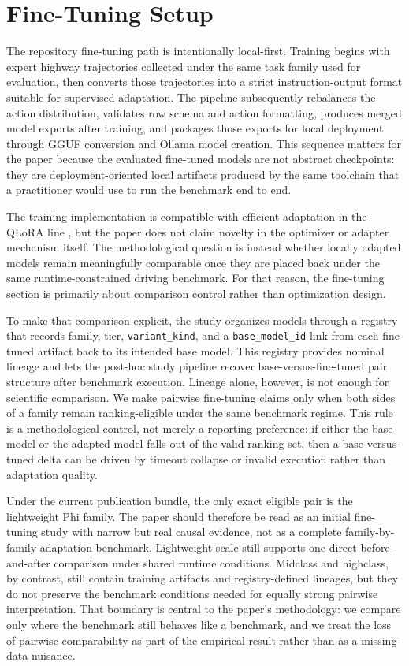\section{Fine-Tuning Setup}

The repository fine-tuning path is intentionally local-first. Training begins with expert highway trajectories collected under the same task family used for evaluation, then converts those trajectories into a strict instruction-output format suitable for supervised adaptation. The pipeline subsequently rebalances the action distribution, validates row schema and action formatting, produces merged model exports after training, and packages those exports for local deployment through GGUF conversion and Ollama model creation. This sequence matters for the paper because the evaluated fine-tuned models are not abstract checkpoints: they are deployment-oriented local artifacts produced by the same toolchain that a practitioner would use to run the benchmark end to end.

The training implementation is compatible with efficient adaptation in the QLoRA line \cite{dettmers2023qlora}, but the paper does not claim novelty in the optimizer or adapter mechanism itself. The methodological question is instead whether locally adapted models remain meaningfully comparable once they are placed back under the same runtime-constrained driving benchmark. For that reason, the fine-tuning section is primarily about comparison control rather than optimization design.

To make that comparison explicit, the study organizes models through a registry that records family, tier, \texttt{variant\_kind}, and a \texttt{base\_model\_id} link from each fine-tuned artifact back to its intended base model. This registry provides nominal lineage and lets the post-hoc study pipeline recover base-versus-fine-tuned pair structure after benchmark execution. Lineage alone, however, is not enough for scientific comparison. We make pairwise fine-tuning claims only when both sides of a family remain ranking-eligible under the same benchmark regime. This rule is a methodological control, not merely a reporting preference: if either the base model or the adapted model falls out of the valid ranking set, then a base-versus-tuned delta can be driven by timeout collapse or invalid execution rather than adaptation quality.

Under the current publication bundle, the only exact eligible pair is the lightweight Phi family. The paper should therefore be read as an initial fine-tuning study with narrow but real causal evidence, not as a complete family-by-family adaptation benchmark. Lightweight scale still supports one direct before-and-after comparison under shared runtime conditions. Midclass and highclass, by contrast, still contain training artifacts and registry-defined lineages, but they do not preserve the benchmark conditions needed for equally strong pairwise interpretation. That boundary is central to the paper's methodology: we compare only where the benchmark still behaves like a benchmark, and we treat the loss of pairwise comparability as part of the empirical result rather than as a missing-data nuisance.

